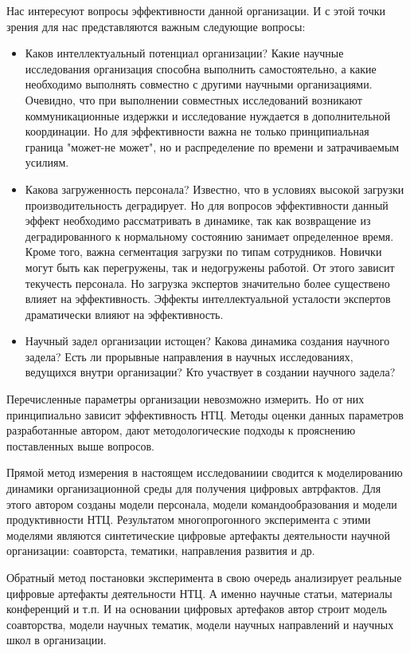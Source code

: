 Нас интересуют вопросы эффективности данной организации. 
И с этой точки зрения для нас представляются важным следующие вопросы: 
\begin{itemize}
\item 
Каков интеллектуальный потенциал организации? 
Какие научные исследования организация способна выполнить самостоятельно, а какие необходимо выполнять совместно с другими научными организациями. 
Очевидно, что при выполнении совместных исследований возникают коммуникационные издержки и исследование нуждается в дополнительной координации. 
Но для эффективности важна не только принципиальная граница "может-не может", но и распределение по времени и затрачиваемым усилиям. 
\item 
Какова загруженность персонала? 
Известно, что в условиях высокой загрузки производительность деградирует.
Но для вопросов эффективности данный эффект необходимо рассматривать в динамике, так как возвращение из  деградированного к нормальному состоянию занимает определенное время.
Кроме того, важна сегментация загрузки по типам сотрудников. 
Новички могут быть как перегружены, так и недогружены работой. 
От этого зависит текучесть персонала. 
Но загрузка экспертов значительно более существено влияет на эффективность. 
Эффекты интеллектуальной усталости экспертов драматически влияют на эффективность. 
\item  
Научный задел организации истощен? 
Какова динамика создания научного задела? 
Есть ли прорывные направления в научных исследованиях, ведущихся внутри организации? 
Кто участвует в создании научного задела? 
\end{itemize}

Перечисленные параметры организации невозможно измерить.
Но от них принципиально зависит эффективность НТЦ. 
Методы оценки данных параметров разработанные автором, дают методологические подходы к прояснению поставленных выше вопросов.

Прямой метод измерения в настоящем исследованиии сводится к моделированию динамики организационной среды для получения цифровых автрфактов.
Для этого автором созданы модели персонала, модели командообразования и модели продуктивности НТЦ. 
Результатом многопрогонного эксперимента с этими моделями являются синтетические цифровые артефакты деятельности научной организации: соавторста, тематики, направления развития и др. 

Обратный метод постановки эксперимента в свою очередь анализирует реальные цифровые артефакты деятельности НТЦ. 
А именно научные статьи, материалы конференций и т.п. И на основании цифровых артефаков автор строит модель соавторства, модели научных тематик, модели научных направлений и научных школ в организации. 

